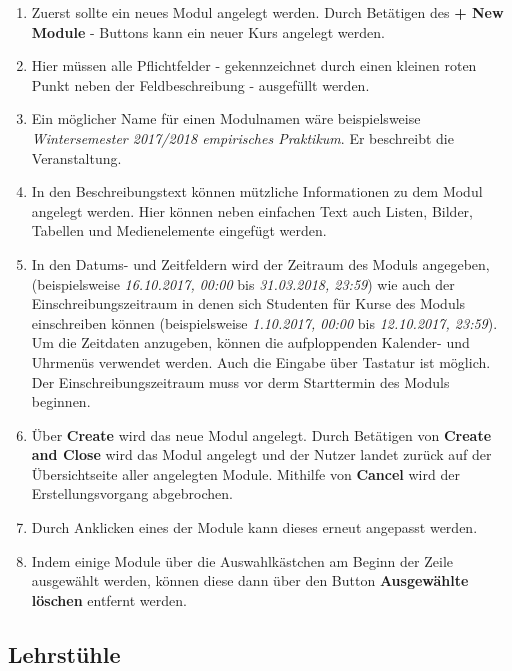     \begin{enumerate}
    \item Zuerst sollte ein neues Modul angelegt werden. Durch Betätigen des \textbf{+ New Module} - Buttons kann ein neuer Kurs angelegt werden.
    \item Hier müssen alle Pflichtfelder - gekennzeichnet durch einen kleinen roten Punkt neben der Feldbeschreibung - ausgefüllt werden.
    \item Ein möglicher Name für einen Modulnamen wäre beispielsweise \textit{Wintersemester 2017/2018 empirisches Praktikum}. Er beschreibt die Veranstaltung.
    \item In den Beschreibungstext können mützliche Informationen zu dem Modul angelegt werden.
	  Hier können neben einfachen Text auch Listen, Bilder, Tabellen und Medienelemente eingefügt werden.
    \item In den Datums- und Zeitfeldern wird der Zeitraum des Moduls angegeben, (beispielsweise \textit{16.10.2017, 00:00} bis \textit{31.03.2018, 23:59}) 
	  wie auch der Einschreibungszeitraum in denen sich Studenten für Kurse des Moduls einschreiben können (beispielsweise \textit{1.10.2017, 00:00} bis \textit{12.10.2017, 23:59}).
	  Um die Zeitdaten anzugeben, können die aufploppenden Kalender- und Uhrmenüs verwendet werden. Auch die Eingabe über Tastatur ist möglich.
	  Der Einschreibungszeitraum muss vor derm Starttermin des Moduls beginnen.
    \item Über \textbf{Create} wird das neue Modul angelegt. 
	  Durch Betätigen von \textbf{Create and Close} wird das Modul angelegt und der Nutzer landet zurück auf der Übersichtseite aller angelegten Module.
	  Mithilfe von \textbf{Cancel} wird der Erstellungsvorgang abgebrochen.
    \item Durch Anklicken eines der Module kann dieses erneut angepasst werden.
    \item Indem einige Module über die Auswahlkästchen am Beginn der Zeile ausgewählt werden, können diese dann über den Button \textbf{Ausgewählte löschen} entfernt werden.
    \end{enumerate}
    
    \subsection{Lehrstühle}
    
